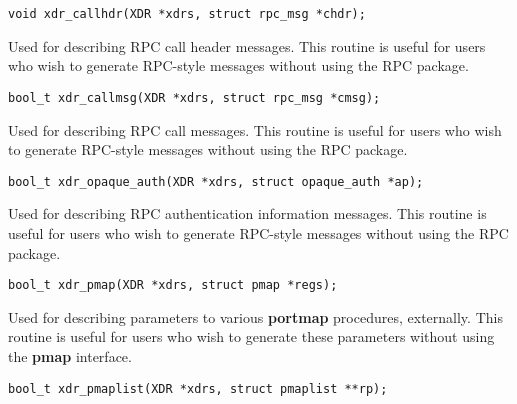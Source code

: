 \documentclass[]{article}
\let\realtextbf=\textbf
\renewcommand{\textbf}[1]{\textcolor{boldcolor}{\realtextbf{#1}}}
\begin{document}
\begin{verbatim}
void xdr_callhdr(XDR *xdrs, struct rpc_msg *chdr);
\end{verbatim}

\begin{description}
\itemsep1pt\parskip0pt
\item[]
Used for describing RPC call header messages. This routine is useful for
users who wish to generate RPC-style messages without using the RPC
package.
\end{description}

\begin{verbatim}
bool_t xdr_callmsg(XDR *xdrs, struct rpc_msg *cmsg);
\end{verbatim}

\begin{description}
\itemsep1pt\parskip0pt
\item[]
Used for describing RPC call messages. This routine is useful for users
who wish to generate RPC-style messages without using the RPC package.
\end{description}

\begin{verbatim}
bool_t xdr_opaque_auth(XDR *xdrs, struct opaque_auth *ap);
\end{verbatim}

\begin{description}
\itemsep1pt\parskip0pt
\item[]
Used for describing RPC authentication information messages. This
routine is useful for users who wish to generate RPC-style messages
without using the RPC package.
\end{description}

\begin{verbatim}
bool_t xdr_pmap(XDR *xdrs, struct pmap *regs);
\end{verbatim}

\begin{description}
\itemsep1pt\parskip0pt
\item[]
Used for describing parameters to various \textbf{portmap} procedures,
externally. This routine is useful for users who wish to generate these
parameters without using the \textbf{pmap} interface.
\end{description}

\begin{verbatim}
bool_t xdr_pmaplist(XDR *xdrs, struct pmaplist **rp);
\end{verbatim}
\end{document}
